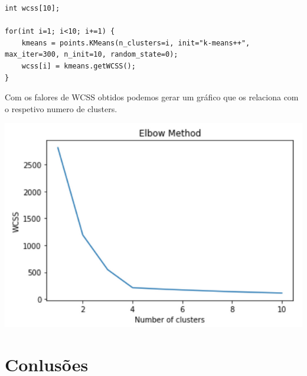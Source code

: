 \documentclass[12pt, a4paper, oneside]{scrreport}
\begin{document}
\begin{lstlisting}
int wcss[10]; 

for(int i=1; i<10; i+=1) {
	kmeans = points.KMeans(n_clusters=i, init="k-means++", max_iter=300, n_init=10, random_state=0);
	wcss[i] = kmeans.getWCSS();
}
\end{lstlisting}


Com os falores de WCSS obtidos podemos gerar um gráfico que os relaciona com o respetivo numero de clusters.

\includegraphics[scale=0.5]{ex2.png}

\newpage
\chapter{Conlusões}

\renewcommand\refname{Referências}
\end{document}
